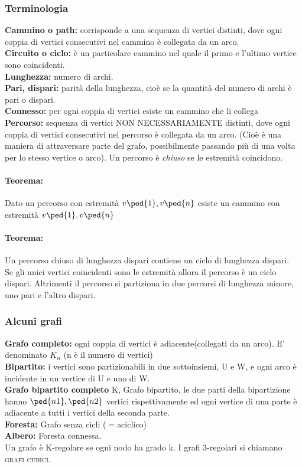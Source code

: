 \subsubsection{Terminologia}

\textbf{Cammino o path:} corrisponde a una sequenza di vertici distinti, dove ogni coppia di vertici consecutivi nel cammino è collegata da un arco. \\
\textbf{Circuito o ciclo:} è un particolare cammino nel quale il primo e l'ultimo vertice sono coincidenti. \\
\textbf{Lunghezza:} numero di archi.\\
\textbf{Pari, dispari:} parità della lunghezza, cioè se la quantità del numero di archi è pari o dispari. \\
\textbf{Connesso:} per ogni coppia di vertici esiste un
cammino che li collega \\
\textbf{Percorso:} sequenza di vertici \textsc{NON NECESSARIAMENTE} distinti, dove ogni coppia di vertici
consecutivi nel percorso è collegata da un arco. (Cioè è una maniera di attraversare parte del
grafo, possibilmente passando più di una volta per lo stesso vertice o arco). Un percorso è \emph{chiuso}
se le estremità coincidono.

\paragraph{Teorema:} Dato un percorso con estremità \( v\ped{1}, v\ped{n} \) esiste un cammino con estremità \( v\ped{1}, v\ped{n} \) 
\paragraph{Teorema:} Un percorso chiuso di lunghezza dispari contiene un ciclo di lunghezza dispari. \\
Se gli unici vertici coincidenti sono le estremità allora il percorso è un ciclo dispari. Altrimenti il percorso si partiziona in due percorsi di lunghezza minore, uno pari e l'altro dispari.

\subsubsection{Alcuni grafi} 
\textbf{Grafo completo:} ogni coppia di vertici è adiacente(collegati da un arco). E' denominato $K_n$ (n è il numero di vertici) \\
\textbf{Bipartito:} i vertici sono partizionabili in due sottoinsiemi, U e W, e ogni arco è incidente in un vertice di U e uno di W. \\
\textbf{Grafo bipartito completo} K, Grafo bipartito, le due parti della bipartizione hanno \( \ped{n1}, \ped{n2} \) vertici rispettivamente ed ogni vertice di una parte è adiacente a tutti i vertici della seconda parte. \\
\textbf{Foresta:} Grafo senza cicli ($=$aciclico) \\
\textbf{Albero:} Foresta connessa. \\
Un grafo è K-regolare se ogni nodo ha grado k. I grafi 3-regolari si chiamano \textsc{grafi cubici}. \\


